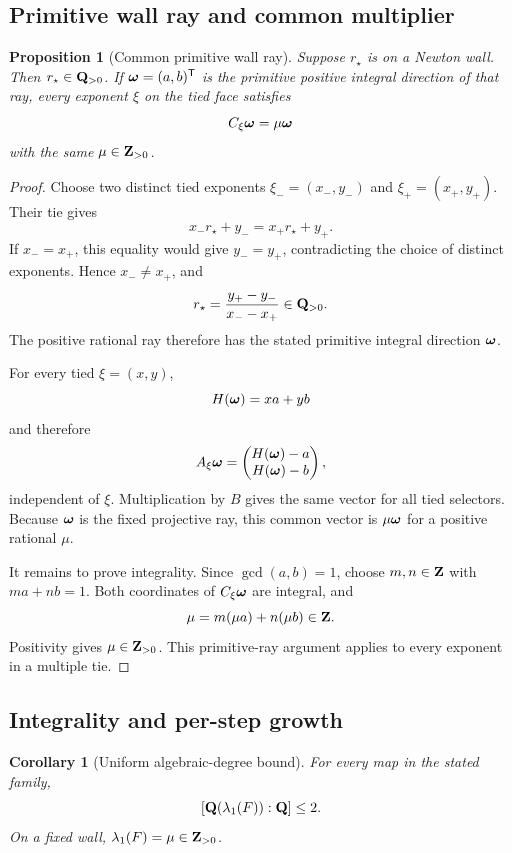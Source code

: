\documentclass[11pt]{article}
\newtheorem{proposition}[theorem]{Proposition}
\newtheorem{corollary}[theorem]{Corollary}
\theoremstyle{definition}
\theoremstyle{remark}
\begin{document}
\subsection{Primitive wall ray and common multiplier}

\begin{proposition}[Common primitive wall ray]\label{prop:wall-ray}
Suppose \(r_\star\) is on a Newton wall.  Then
\(r_\star\in\mathbf{Q}_{>0}\).  If \(\boldsymbol{\omega}=(a,b)^{\mathsf T}\) is the primitive
positive integral direction of that ray, every exponent \(\xi\) on the
tied face satisfies
\[
C_\xi\boldsymbol{\omega}=\mu\boldsymbol{\omega}
\]
with the same \(\mu\in\mathbf{Z}_{>0}\).
\end{proposition}

\begin{proof}
Choose two distinct tied exponents
\(\xi_-=(x_-,y_-)\) and \(\xi_+=(x_+,y_+)\).  Their tie gives
\[
x_-r_\star+y_-=x_+r_\star+y_+.
\]
If \(x_-=x_+\), this equality would give \(y_-=y_+\), contradicting
the choice of distinct exponents.  Hence \(x_-\neq x_+\), and
\[
r_\star=\frac{y_+-y_-}{x_--x_+}\in\mathbf{Q}_{>0}.
\]
The positive rational ray therefore has the stated primitive integral
direction \(\boldsymbol{\omega}\).

For every tied \(\xi=(x,y)\),
\[
H(\boldsymbol{\omega})=xa+yb
\]
and therefore
\[
A_\xi\boldsymbol{\omega}=
\begin{pmatrix}H(\boldsymbol{\omega})-a\\H(\boldsymbol{\omega})-b\end{pmatrix},
\]
independent of \(\xi\).  Multiplication by \(B\) gives the same vector for
all tied selectors.  Because \(\boldsymbol{\omega}\) is the fixed projective ray, this
common vector is \(\mu\boldsymbol{\omega}\) for a positive rational \(\mu\).

It remains to prove integrality.  Since \(\gcd(a,b)=1\), choose
\(m,n\in\mathbf{Z}\) with \(ma+nb=1\).  Both coordinates of
\(C_\xi\boldsymbol{\omega}\) are integral, and
\[
\mu=m(\mu a)+n(\mu b)\in\mathbf{Z}.
\]
Positivity gives \(\mu\in\mathbf{Z}_{>0}\).  This primitive-ray argument applies
to every exponent in a multiple tie.
\end{proof}

\subsection{Integrality and per-step growth}

\begin{corollary}[Uniform algebraic-degree bound]\label{cor:quadratic}
For every map in the stated family,
\[
[\mathbf{Q}(\lambda_1(F)):\mathbf{Q}]\leq2.
\]
On a fixed wall, \(\lambda_1(F)=\mu\in\mathbf{Z}_{>0}\).
\end{corollary}
\end{document}

